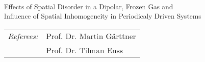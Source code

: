 \begin{titlepage}
    \begin{addmargin}[-1cm]{-3cm}
    \begin{center}
        \large

        \hfill

        \vfill

        \begingroup
            \color{CTtitle} \\ \bigskip\bigskip
        Effects of Spatial Disorder in a Dipolar, Frozen Gas and\\
        Influence of Spatial Inhomogeneity in Periodicaly Driven Systems
        \endgroup

        \vfill

    \end{center}
    \vfill
    \begin{center}
        \begin{tabular}{ll}
             \textit{Referees:}\hspace{0.5cm} & Prof. Dr. Martin Gärttner\\
             & Prof. Dr. Tilman Enss
        \end{tabular}
    \end{center}
  \end{addmargin}
\end{titlepage}
